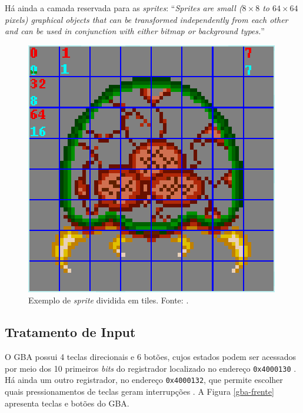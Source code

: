     Há ainda a camada reservada para as \textit{sprites}: ``\textit{Sprites are small ($8\times8$ to $64\times64$ pixels) graphical objects that can be transformed independently from each other and can be used in conjunction with either bitmap or background types.}'' \cite[p. 38]{tonc}

    \begin{figure}[H]
    \centering \includegraphics[keepaspectratio=true,scale=0.6]{figuras/metroid-sprite.eps}
      \caption[Exemplo de \textit{sprite} dividida em tiles]
        {Exemplo de \textit{sprite} dividida em tiles. Fonte: \cite{tonc}.}
      \label{metroid-sprite}
    \end{figure}

  \subsection{Tratamento de Input}

    O GBA possui 4 teclas direcionais e 6 botões, cujos estados podem ser acessados por meio dos 10 primeiros \textit{bits} do registrador localizado no endereço \texttt{0x4000130} \cite{gbatek}. Há ainda um outro registrador, no endereço \texttt{0x4000132}, que permite escolher quais pressionamentos de teclas geram interrupções \cite{cowbite}. A Figura \ref  {gba-frente} apresenta teclas e botões do GBA.

